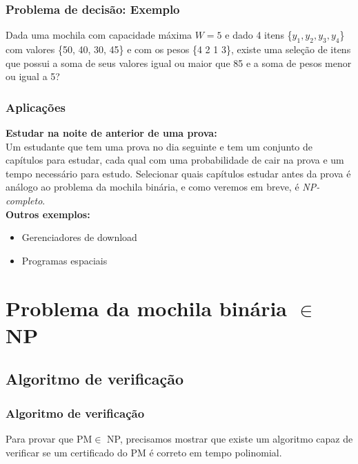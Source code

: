 \documentclass{beamer}
\begin{document}
\begin{frame}
\frametitle{Problema de decisão: Exemplo}
    Dada uma mochila com capacidade máxima $W = 5$ e dado 4 itens \{$y_{1}, y_{2}, y_{3}, y_{4}$\} com valores \{50, 40, 30, 45\} e com os pesos \{4 2 1 3\}, existe uma seleção de itens que possui a soma de seus valores igual ou maior que 85 e a soma de pesos menor ou igual a 5?

\end{frame}

\begin{frame}
    \frametitle{Aplicações}
    \textbf{Estudar na noite de anterior de uma prova:} \\
    Um estudante que tem uma prova no dia seguinte e tem um conjunto
    de capítulos para estudar, cada qual com uma probabilidade de cair
    na prova e um tempo necessário para estudo. Selecionar quais capítulos
    estudar antes da prova é análogo ao problema da mochila binária, e como
    veremos em breve, é \textit{NP-completo}. \\
    
    \textbf{Outros exemplos:} \\
    \begin{itemize}
        \item
            Gerenciadores de download
        \item
            Programas espaciais

    \end{itemize}


\end{frame}


\section{Problema da mochila binária $\in$ NP}

\subsection{Algoritmo de verificação}
\begin{frame}
    \frametitle{Algoritmo de verificação}
    Para provar que PM\footnotemark $\in$ NP, precisamos mostrar que existe um algoritmo
    capaz de verificar se um certificado do PM é correto em tempo polinomial.

\end{frame}
\end{document}
